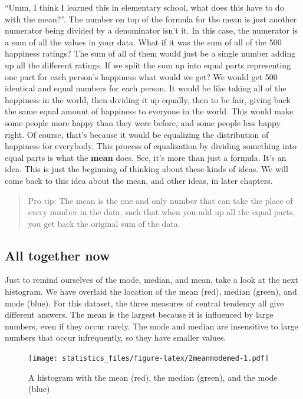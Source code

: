 \documentclass[]{book}
\begin{document}
``Umm, I think I learned this in elementary school, what does this have to do with the mean?''. The number on top of the formula for the mean is just another numerator being divided by a denominator isn't it. In this case, the numerator is a sum of all the values in your data. What if it was the sum of all of the 500 happiness ratings? The sum of all of them would just be a single number adding up all the different ratings. If we split the sum up into equal parts representing one part for each person's happiness what would we get? We would get 500 identical and equal numbers for each person. It would be like taking all of the happiness in the world, then dividing it up equally, then to be fair, giving back the same equal amount of happiness to everyone in the world. This would make some people more happy than they were before, and some people less happy right. Of course, that's because it would be equalizing the distribution of happiness for everybody. This process of equalization by dividing something into equal parts is what the \textbf{mean} does. See, it's more than just a formula. It's an idea. This is just the beginning of thinking about these kinds of ideas. We will come back to this idea about the mean, and other ideas, in later chapters.

\begin{quote}
Pro tip: The mean is the one and only number that can take the place of every number in the data, such that when you add up all the equal parts, you get back the original sum of the data.
\end{quote}

\hypertarget{all-together-now}{%
\subsection{All together now}\label{all-together-now}}

Just to remind ourselves of the mode, median, and mean, take a look at the next histogram. We have overlaid the location of the mean (red), median (green), and mode (blue). For this dataset, the three measures of central tendency all give different answers. The mean is the largest because it is influenced by large numbers, even if they occur rarely. The mode and median are insensitive to large numbers that occur infrequently, so they have smaller values.

\begin{figure}
\centering
\texttt{[image: statistics\_files/figure-latex/2meanmodemed-1.pdf]}
\caption{\label{fig:2meanmodemed}A histogram with the mean (red), the median (green), and the mode (blue)}
\end{figure}
\end{document}
